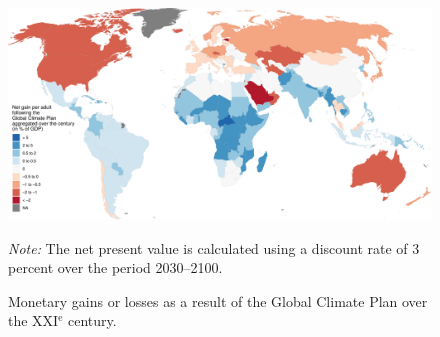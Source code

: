 \documentclass[a5paper,english,openany]{memoir}
\begin{document}
\begin{figure}
  \caption[Net gains by country over the XXI$^\text{e}$ century]{Monetary gains or losses as a result of the Global Climate Plan over the XXI$^\text{e}$ century.}\label{fig:gain_npv}
  \centerline{\includegraphics[width=.9\paperheight]{../figures/maps/npv_over_gdp_gcs_adj.pdf}
    } %
  {\footnotesize \textit{Note:} The net present value is calculated using a discount rate of 3 percent over the period 2030--2100}.
\end{figure}
\end{document}
